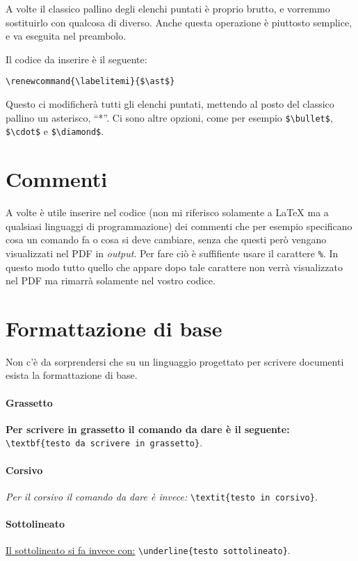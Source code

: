 A volte il classico pallino degli elenchi puntati è proprio brutto, e vorremmo
sostituirlo con qualcosa di diverso.
Anche questa operazione è piuttosto semplice, e va eseguita nel preambolo.

\noindent Il codice da inserire è il seguente:

\verb!\renewcommand{\labelitemi}{$\ast$}!

\noindent Questo ci modificherà tutti gli elenchi puntati, mettendo al posto
del classico pallino un asterisco, ``*''. Ci sono altre opzioni, come per
esempio \verb!$\bullet$!, \verb!$\cdot$! e \verb!$\diamond$!.

\section{Commenti}
A volte è utile inserire nel codice (non mi riferisco solamente a \LaTeX{} ma 
a qualsiasi linguaggi di programmazione) dei commenti che per esempio 
specificano cosa un comando fa o cosa si deve cambiare, senza che questi però 
vengano visualizzati nel PDF in \textit{output}. Per fare ciò è suffifiente 
usare il carattere \texttt{\%}. In questo modo tutto quello che appare dopo 
tale carattere non verrà visualizzato nel PDF ma rimarrà solamente nel vostro 
codice.

\section{Formattazione di base}

Non c'è da sorprendersi che su un linguaggio progettato per scrivere documenti
esista la formattazione di base.

\paragraph*{Grassetto} \textbf{Per scrivere in grassetto il comando da dare è
il seguente: }\verb!\textbf{testo da scrivere in grassetto}!.

\paragraph*{Corsivo} \textit{Per il corsivo il comando da dare è invece: }
\verb!\textit{testo in corsivo}!.

\paragraph*{Sottolineato} \underline{Il sottolineato si fa invece con:}
\verb!\underline{testo sottolineato}!.

